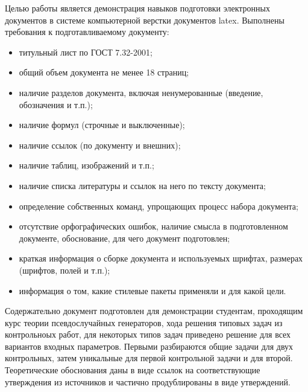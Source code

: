 \Introduction

Целью работы является демонстрация навыков подготовки электронных документов в системе компьютерной верстки документов latex. Выполнены требования к подготавливаемому документу:

\begin{itemize}
\item титульный лист по ГОСТ 7.32-2001;
\item общий объем документа не менее 18 страниц;
\item наличие разделов документа, включая ненумерованные (введение, обозначения и т.п.);
\item наличие формул (строчные и выключенные);
\item наличие ссылок (по документу и внешних);
\item наличие таблиц, изображений и т.п.;
\item наличие списка литературы и ссылок на него по тексту документа;
\item определение собственных команд, упрощающих процесс набора документа;
\item отсутствие орфографических ошибок, наличие смысла в подготовленном документе,
обоснование, для чего документ подготовлен;
\item краткая информация о сборке документа и используемых шрифтах, размерах (шрифтов, полей и т.п.);
\item информация о том, какие стилевые пакеты применяли и для какой цели.
\end{itemize}

Содержательно документ подготовлен для демонстрации студентам, проходящим курс теории псевдослучайных генераторов, хода решения типовых задач из контрольноых работ, для некоторых типов задач приведено решение для всех вариантов входных параметров. Первыми разбираются общие задачи для двух контрольных, затем уникальные для первой контрольной задачи и для второй. Теоретические обоснования даны в виде ссылок на соответствующие утверждения из источников и частично продублированы в виде утверждений. 
